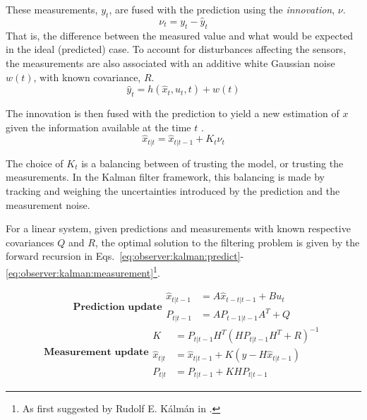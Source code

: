     These measurements, $y_{t}$, are fused with the
    prediction using the \textit{innovation}, $\nu$.
    \begin{equation}
        \nu_{t} = y_{t} - \hat{y}_{t}
    \end{equation}
    That is, the difference between the measured value and what would be
    expected in the ideal (predicted) case.
    To account for disturbances affecting the sensors, the measurements
    are also associated with an additive white Gaussian noise $w(t)$, with
    known covariance, $R$.
    \begin{equation}
        \hat{y}_{t} = h(\hat{x}_{t}, u_{t}, t) + w(t)
    \end{equation}

    The innovation is then fused with the prediction to yield a new
    estimation of $x$ given the
    information available at the time $t$ \citep{gustafsson2010statistical}.
    \begin{equation}
        \hat{x}_{t|t} = \hat{x}_{t|t-1} + K_{t}\nu_{t}
    \end{equation}

    The choice of $K_{t}$ is a balancing between of trusting the model,
    or trusting the measurements. In the Kalman filter framework,
    this balancing is made by tracking and weighing the uncertainties
    introduced by the prediction and the measurement noise.

    \begin{algorithm}
        \label{alg:kf}
        For a linear system, given predictions and measurements with known respective
        covariances $Q$ and $R$, the optimal solution to the filtering
        problem is given by the forward
        recursion in Eqs.~\eqref{eq:observer:kalman:predict}-\eqref{eq:observer:kalman:measurement}\footnote{As first suggested by Rudolf E. Kálmán in \cite{kalman1960}.}.

        \begin{subequations}
            \label{eq:observer:kalman:predict}
            \textbf{Prediction update}
            \begin{align}
                \hat{x}_{t|t-1} &= A \hat{x}_{t-t|t-1} + B u_{t} \\
                P_{t|t-1} &= A P_{t-1|t-1} A^{T} + Q
            \end{align}
        \end{subequations}
        \begin{subequations}
            \label{eq:observer:kalman:measurement}
            \textbf{Measurement update}
            \begin{align}
                K &= P_{t|t-1} H^{T} \left( H P_{t|t-1} H^{T} + R \right)^{-1}  \label{eq:observer:filtering:kalmanK} \\
                \hat{x}_{t|t} &= \hat{x}_{t|t-1} + K \left( y - H \hat{x}_{t|t-1} \right) \\
                P_{t|t} &= P_{t|t-1} + K H P_{t|t-1}
            \end{align}
        \end{subequations}
    \end{algorithm}


